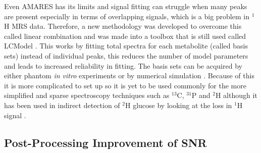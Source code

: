 Even \ac{AMARES} has its limits and signal fitting can struggle when many peaks are present especially in terms of overlapping signals, which is a big problem in $^1$H \ac{MRS} data. Therefore, a new methodology was developed to overcome this called linear combination and was made into a toolbox that is still used called LCModel \cite{Provencher1993EstimationSpectra}. This works by fitting total spectra for each metabolite (called basis sets) instead of individual peaks, this reduces the number of model parameters and leads to increased reliability in fitting. The basis sets can be acquired by either phantom \textit{in vitro} experiments or by numerical simulation \cite{Near2021PreprocessingRecommendations}. Because of this it is more complicated to set up so it is yet to be used commonly for the more simplified and sparse spectroscopy techniques such as $^{13}$C, $^{31}$P and $^2$H although it has been used in indirect detection of $^2$H glucose by looking at the loss in $^1$H signal \cite{Rich20201HVivo,Cember2022IntegratingHumans,Niess2023Reproducibility3T}. 

\subsection{Post-Processing Improvement of SNR}

